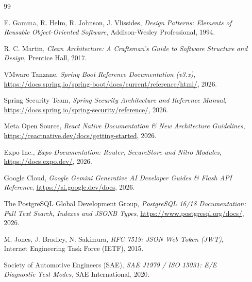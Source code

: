 \documentclass[12pt,a4paper,twoside,openright]{report}
\begin{document}
  \cleardoublepage
  \begin{thebibliography}{99}

  E. Gamma, R. Helm, R. Johnson, J. Vlissides,
  \textit{Design Patterns: Elements of Reusable Object-Oriented Software},
  Addison-Wesley Professional, 1994.

  R. C. Martin,
  \textit{Clean Architecture: A Craftsman's Guide to Software Structure and Design},
  Prentice Hall, 2017.

  VMware Tanzane,
  \textit{Spring Boot Reference Documentation (v3.x)},
  \url{https://docs.spring.io/spring-boot/docs/current/reference/html/}, 2026.

  Spring Security Team,
  \textit{Spring Security Architecture and Reference Manual},
  \url{https://docs.spring.io/spring-security/reference/}, 2026.

  Meta Open Source,
  \textit{React Native Documentation \& New Architecture Guidelines},
  \url{https://reactnative.dev/docs/getting-started}, 2026.

  Expo Inc.,
  \textit{Expo Documentation: Router, SecureStore and Nitro Modules},
  \url{https://docs.expo.dev/}, 2026.

  Google Cloud,
  \textit{Google Gemini Generative AI Developer Guides \& Flash API Reference},
  \url{https://ai.google.dev/docs}, 2026.

  The PostgreSQL Global Development Group,
  \textit{PostgreSQL 16/18 Documentation: Full Text Search, Indexes and JSONB Types},
  \url{https://www.postgresql.org/docs/}, 2026.

  M. Jones, J. Bradley, N. Sakimura,
  \textit{RFC 7519: JSON Web Token (JWT)},
  Internet Engineering Task Force (IETF), 2015.

  Society of Automotive Engineers (SAE),
  \textit{SAE J1979 / ISO 15031: E/E Diagnostic Test Modes},
  SAE International, 2020.

  \end{thebibliography}

  
\end{document}
